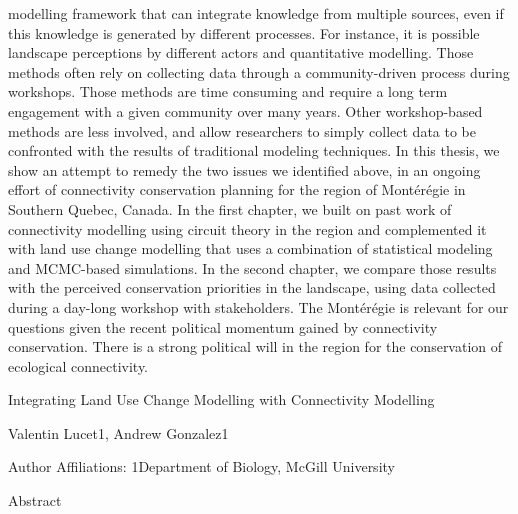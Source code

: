 \documentclass[]{article}
\begin{document}
modelling framework that can integrate knowledge from multiple sources,
even if this knowledge is generated by different processes. For
instance, it is possible landscape perceptions by different actors and
quantitative modelling. Those methods often rely on collecting data
through a community-driven process during workshops. Those methods are
time consuming and require a long term engagement with a given community
over many years. Other workshop-based methods are less involved, and
allow researchers to simply collect data to be confronted with the
results of traditional modeling techniques. In this thesis, we show an
attempt to remedy the two issues we identified above, in an ongoing
effort of connectivity conservation planning for the region of
Montérégie in Southern Quebec, Canada. In the first chapter, we built on
past work of connectivity modelling using circuit theory in the region
and complemented it with land use change modelling that uses a
combination of statistical modeling and MCMC-based simulations. In the
second chapter, we compare those results with the perceived conservation
priorities in the landscape, using data collected during a day-long
workshop with stakeholders. The Montérégie is relevant for our questions
given the recent political momentum gained by connectivity conservation.
There is a strong political will in the region for the conservation of
ecological connectivity.

Integrating Land Use Change Modelling with Connectivity Modelling

{Valentin Lucet{1}, Andrew Gonzalez{1}}

Author Affiliations: {{1}Department of Biology, McGill University}

Abstract
\end{document}
